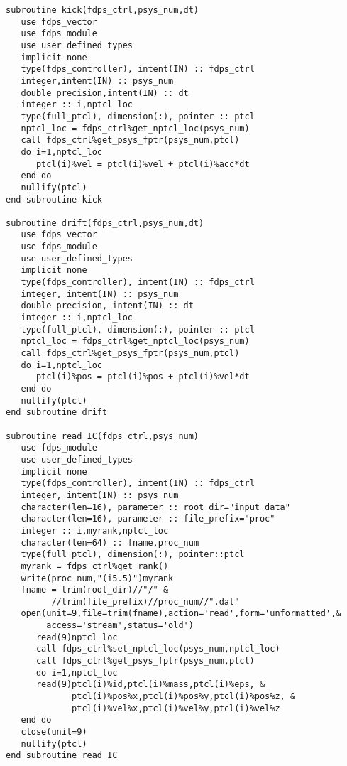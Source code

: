 \documentclass[10pt,twocolumn,a4paper,fleqn]{article}
\begin{document}
\begin{mdframed}[
    backgroundcolor=bg,
    topline=false,
    bottomline=false,
    leftline=false,
    rightline=false]
\begin{verbatim}
subroutine kick(fdps_ctrl,psys_num,dt)
   use fdps_vector
   use fdps_module
   use user_defined_types
   implicit none
   type(fdps_controller), intent(IN) :: fdps_ctrl
   integer,intent(IN) :: psys_num
   double precision,intent(IN) :: dt
   integer :: i,nptcl_loc
   type(full_ptcl), dimension(:), pointer :: ptcl
   nptcl_loc = fdps_ctrl%get_nptcl_loc(psys_num)
   call fdps_ctrl%get_psys_fptr(psys_num,ptcl)
   do i=1,nptcl_loc
      ptcl(i)%vel = ptcl(i)%vel + ptcl(i)%acc*dt
   end do
   nullify(ptcl)
end subroutine kick

subroutine drift(fdps_ctrl,psys_num,dt)
   use fdps_vector
   use fdps_module
   use user_defined_types
   implicit none
   type(fdps_controller), intent(IN) :: fdps_ctrl
   integer, intent(IN) :: psys_num
   double precision, intent(IN) :: dt
   integer :: i,nptcl_loc
   type(full_ptcl), dimension(:), pointer :: ptcl
   nptcl_loc = fdps_ctrl%get_nptcl_loc(psys_num)
   call fdps_ctrl%get_psys_fptr(psys_num,ptcl)
   do i=1,nptcl_loc
      ptcl(i)%pos = ptcl(i)%pos + ptcl(i)%vel*dt
   end do
   nullify(ptcl)
end subroutine drift

subroutine read_IC(fdps_ctrl,psys_num)
   use fdps_module
   use user_defined_types
   implicit none
   type(fdps_controller), intent(IN) :: fdps_ctrl
   integer, intent(IN) :: psys_num
   character(len=16), parameter :: root_dir="input_data"
   character(len=16), parameter :: file_prefix="proc"
   integer :: i,myrank,nptcl_loc
   character(len=64) :: fname,proc_num
   type(full_ptcl), dimension(:), pointer::ptcl
   myrank = fdps_ctrl%get_rank()
   write(proc_num,"(i5.5)")myrank
   fname = trim(root_dir)//"/" &
         //trim(file_prefix)//proc_num//".dat"
   open(unit=9,file=trim(fname),action='read',form='unformatted',&
        access='stream',status='old')
      read(9)nptcl_loc
      call fdps_ctrl%set_nptcl_loc(psys_num,nptcl_loc)
      call fdps_ctrl%get_psys_fptr(psys_num,ptcl)
      do i=1,nptcl_loc
      read(9)ptcl(i)%id,ptcl(i)%mass,ptcl(i)%eps, &
             ptcl(i)%pos%x,ptcl(i)%pos%y,ptcl(i)%pos%z, &
             ptcl(i)%vel%x,ptcl(i)%vel%y,ptcl(i)%vel%z
   end do
   close(unit=9)
   nullify(ptcl)
end subroutine read_IC
\end{verbatim}
\end{mdframed}



\end{document}
